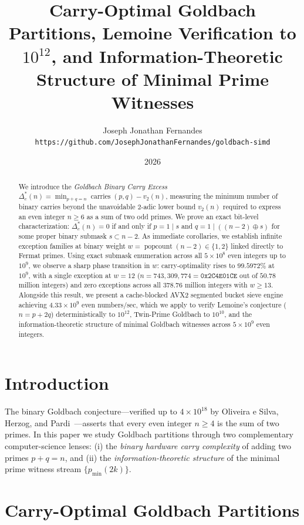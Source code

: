 \documentclass[11pt,a4paper]{article}
\title{\textbf{Carry-Optimal Goldbach Partitions, Lemoine Verification to $10^{12}$, and Information-Theoretic Structure of Minimal Prime Witnesses}}
\author{Joseph Jonathan Fernandes\\
\texttt{https://github.com/JosephJonathanFernandes/goldbach-simd}}
\date{2026}
\begin{document}
\maketitle

\begin{abstract}
We introduce the \emph{Goldbach Binary Carry Excess} $\Delta_c^*(n) = \min_{p+q=n} \operatorname{carries}(p, q) - v_2(n)$, measuring the minimum number of binary carries beyond the unavoidable $2$-adic lower bound $v_2(n)$ required to express an even integer $n \ge 6$ as a sum of two odd primes. We prove an exact bit-level characterization: $\Delta_c^*(n) = 0$ if and only if $p = 1 \mathbin{|} s$ and $q = 1 \mathbin{|} ((n - 2) \oplus s)$ for some proper binary submask $s \subset n - 2$. As immediate corollaries, we establish infinite exception families at binary weight $w = \operatorname{popcount}(n - 2) \in \{1, 2\}$ linked directly to Fermat primes. Using exact submask enumeration across all $5 \times 10^8$ even integers up to $10^9$, we observe a sharp phase transition in $w$: carry-optimality rises to $99.5972\%$ at $10^9$, with a single exception at $w = 12$ ($n = 743{,}309{,}774 = \texttt{0x2C4E01CE}$ out of $50.78$ million integers) and zero exceptions across all $378.76$ million integers with $w \ge 13$. Alongside this result, we present a cache-blocked AVX2 segmented bucket sieve engine achieving $4.33 \times 10^9$ even numbers/sec, which we apply to verify Lemoine's conjecture ($n = p + 2q$) deterministically to $10^{12}$, Twin-Prime Goldbach to $10^{10}$, and the information-theoretic structure of minimal Goldbach witnesses across $5 \times 10^9$ even integers.
\end{abstract}

\section{Introduction}
The binary Goldbach conjecture—verified up to $4 \times 10^{18}$ by Oliveira e Silva, Herzog, and Pardi~\cite{oliveira2014}—asserts that every even integer $n \ge 4$ is the sum of two primes. In this paper we study Goldbach partitions through two complementary computer-science lenses: (i) the \emph{binary hardware carry complexity} of adding two primes $p + q = n$, and (ii) the \emph{information-theoretic structure} of the minimal prime witness stream $\{p_{\min}(2k)\}$.

\section{Carry-Optimal Goldbach Partitions}
\end{document}
